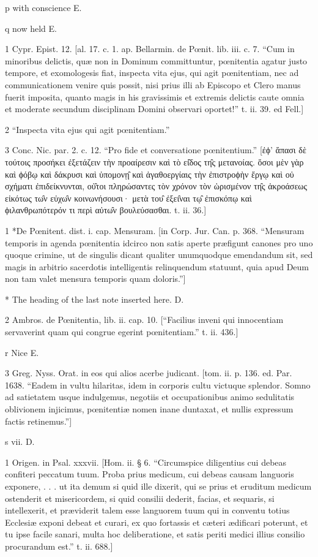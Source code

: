 p
with conscience E.

q
now held E.

1
Cypr. Epist. 12. [al. 17. c. 1. ap. Bellarmin. de Pœnit. lib. iii. c. 7. “Cum in minoribus delictis, quæ non in Dominum committuntur, pœnitentia agatur justo tempore, et exomologesis fiat, inspecta vita ejus, qui agit pœnitentiam, nec ad communicationem venire quis possit, nisi prius illi ab Episcopo et Clero manus fuerit imposita, quanto magis in his gravissimis et extremis delictis caute omnia et moderate secundum disciplinam Domini observari oportet!” t. ii. 39. ed Fell.]

2
“Inspecta vita ejus qui agit pœnitentiam.”

3
Conc. Nic. par. 2. c. 12. “Pro fide et conversatione pœnitentium.” [ἐϕ’ ἅπασι δὲ τούτοις προσήκει ἐξετάζειν τὴν προαίρεσιν καὶ τὸ εἰ̑δος τη̑ς μετανοίας. ὅσοι μὲν γὰρ καὶ ϕόβῳ καὶ δάκρυσι καὶ ὑπομονῃ̑ καὶ ἀγαθοεργίαις τὴν ἐπιστροϕὴν ἔργῳ καὶ οὐ σχήματι ἐπιδείκνυνται, οὑ̑τοι πληρώσαντες τὸν χρόνον τὸν ὡρισμένον τη̑ς ἀκροάσεως εἰκότως τω̑ν εὐχω̑ν κοινωνήσουσι· μετὰ του̑ ἐξει̑ναι τῳ̑ ἐπισκόπῳ καὶ ϕιλανθρωπότερόν τι περὶ αὐτω̑ν βουλεύσασθαι. t. ii. 36.]

1
*De Pœnitent. dist. i. cap. Mensuram. [in Corp. Jur. Can. p. 368. “Mensuram temporis in agenda pœnitentia idcirco non satis aperte præfigunt canones pro uno quoque crimine, ut de singulis dicant qualiter unumquodque emendandum sit, sed magis in arbitrio sacerdotis intelligentis relinquendum statuunt, quia apud Deum non tam valet mensura temporis quam doloris.”]

*
The heading of the last note inserted here. D.

2
Ambros. de Pœnitentia, lib. ii. cap. 10. [“Facilius inveni qui innocentiam servaverint quam qui congrue egerint pœnitentiam.” t. ii. 436.]

r
Nice E.

3
Greg. Nyss. Orat. in eos qui alios acerbe judicant. [tom. ii. p. 136. ed. Par. 1638. “Eadem in vultu hilaritas, idem in corporis cultu victuque splendor. Somno ad satietatem usque indulgemus, negotiis et occupationibus animo sedulitatis oblivionem injicimus, pœnitentiæ nomen inane duntaxat, et nullis expressum factis retinemus.”]

s
vii. D.

1
Origen. in Psal. xxxvii. [Hom. ii. § 6. “Circumspice diligentius cui debeas confiteri peccatum tuum. Proba prius medicum, cui debeas causam languoris exponere, . . . ut ita demum si quid ille dixerit, qui se prius et eruditum medicum ostenderit et misericordem, si quid consilii dederit, facias, et sequaris, si intellexerit, et præviderit talem esse languorem tuum qui in conventu totius Ecclesiæ exponi debeat et curari, ex quo fortassis et cæteri ædificari poterunt, et tu ipse facile sanari, multa hoc deliberatione, et satis periti medici illius consilio procurandum est.” t. ii. 688.]

